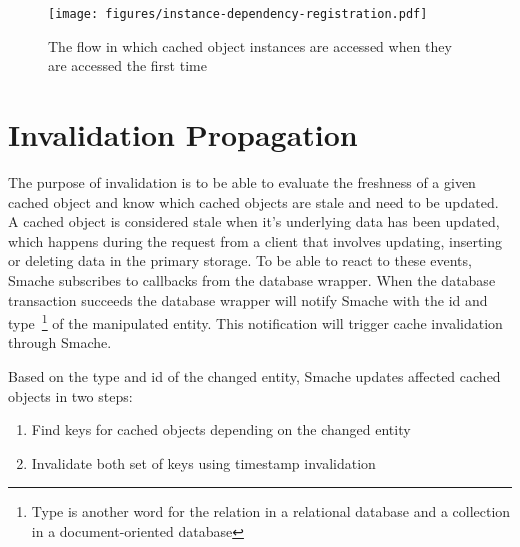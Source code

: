 \begin{figure*}[ht!]
  \centering
  \texttt{[image: figures/instance-dependency-registration.pdf]}
  \caption{The flow in which cached object instances are accessed when they are accessed the first time}
  \label{fig:instance-dependency-registration}
\end{figure*}

\section{Invalidation Propagation}
\label{sec:invalidation-propagation}

The purpose of invalidation is to be able to evaluate the freshness of a given cached object and know which cached objects are stale and need to be updated. A cached object is considered stale when it's underlying data has been updated, which happens during the request from a client that involves updating, inserting or deleting data in the primary storage. To be able to react to these events, Smache subscribes to callbacks from the database wrapper. When the database transaction succeeds the database wrapper will notify Smache with the id and type~\footnote{Type is another word for the relation in a relational database and a collection in a document-oriented database} of the manipulated entity. This notification will trigger cache invalidation through Smache.

Based on the type and id of the changed entity, Smache updates affected cached objects in two steps:

\begin{enumerate}
  \item Find keys for cached objects depending on the changed entity
  \item Invalidate both set of keys using timestamp invalidation
\end{enumerate}

